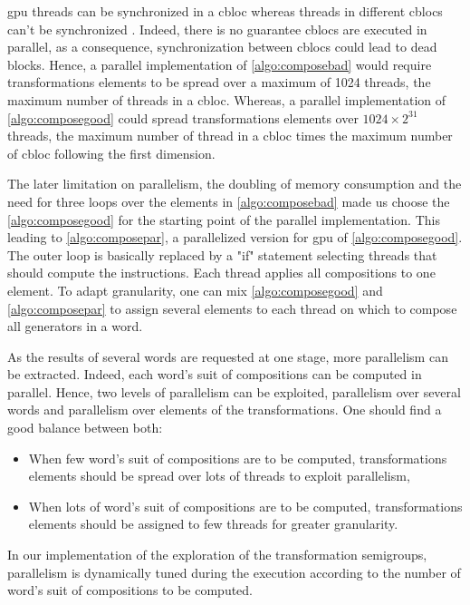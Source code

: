 {\gls{gpu} threads can be synchronized in a \gls{cbloc} whereas threads in different \glspl{cbloc} can't be synchronized \cite{doccuda}. 
Indeed, there is no guarantee \glspl{cbloc} are executed in parallel, as a consequence, synchronization between \glspl{cbloc} could lead to dead blocks. 
Hence, a parallel implementation of \autoref{algo:composebad} would require transformations elements to be spread over a maximum of 1024 threads, the maximum number of threads in a \gls{cbloc}.
Whereas, a parallel implementation of \autoref{algo:composegood} could spread transformations elements over $1024 \times 2^31$ threads, 
the maximum number of thread in a \gls{cbloc} times the maximum number of \gls{cbloc} following the first dimension.

The later limitation on parallelism, the doubling of memory consumption and the need for three loops over the elements in \autoref{algo:composebad} 
made us choose the \autoref{algo:composegood} for the starting point of the parallel implementation. This leading to 
\autoref{algo:composepar}, a parallelized version for \gls{gpu} of \autoref{algo:composegood}. 
The outer loop is basically replaced by a "if" statement selecting threads that should compute the instructions. Each thread applies all compositions to one element.
To adapt granularity, one can mix \autoref{algo:composegood} and \autoref{algo:composepar} to assign several elements to each thread on which to compose all generators in a word.

As the results of several words are requested at one stage, more parallelism can be extracted. 
Indeed, each word's suit of compositions can be computed in parallel. 
Hence, two levels of parallelism can be exploited, parallelism over several words and parallelism over elements of the transformations. One should find a good balance between both:
\begin{itemize}
\item When few word's suit of compositions are to be computed, transformations elements should be spread over lots of threads to exploit parallelism,
\item When lots of word's suit of compositions are to be computed, transformations elements should be assigned to few threads for greater granularity.
\end{itemize}
In our implementation of the exploration of the transformation semigroups, parallelism is dynamically tuned during the execution according to the number of word's suit of compositions to be computed.



}
